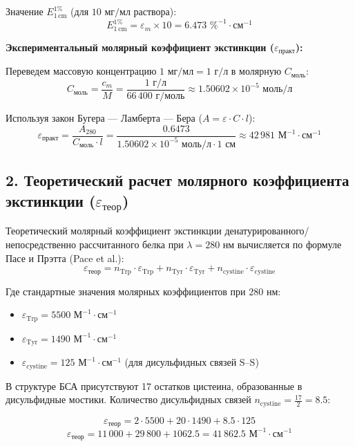 \documentclass[a4paper,12pt]{article}
\begin{document}
Значение $E^{1\%}_{1\,\text{cm}}$ (для $10\text{ мг/мл}$ раствора):
\[
E^{1\%}_{1\,\text{cm}} = \varepsilon_{m} \times 10 = 6.473\text{ \%}^{-1}\cdot\text{см}^{-1}
\]

\newpage
\textbf{Экспериментальный молярный коэффициент экстинкции ($\varepsilon_{\text{практ}}$):}

Переведем массовую концентрацию $1\text{ мг/мл} = 1\text{ г/л}$ в молярную $C_{\text{моль}}$:
\[
C_{\text{моль}} = \frac{c_m}{M} = \frac{1\text{ г/л}}{66\,400\text{ г/моль}} \approx 1.50602 \times 10^{-5}\text{ моль/л}
\]

Используя закон Бугера — Ламберта — Бера ($A = \varepsilon \cdot C \cdot l$):
\[
\varepsilon_{\text{практ}} = \frac{A_{280}}{C_{\text{моль}} \cdot l} = \frac{0.6473}{1.50602 \times 10^{-5}\text{ моль/л} \cdot 1\text{ см}} \approx 42\,981\text{ М}^{-1}\cdot\text{см}^{-1}
\]

\subsection*{2. Теоретический расчет молярного коэффициента экстинкции ($\varepsilon_{\text{теор}}$)}

Теоретический молярный коэффициент экстинкции денатурированного/непосредственно рассчитанного белка при $\lambda = 280\text{ нм}$ вычисляется по формуле Пасе и Прэтта (Pace et al.):
\[
\varepsilon_{\text{теор}} = n_{\text{Trp}} \cdot \varepsilon_{\text{Trp}} + n_{\text{Tyr}} \cdot \varepsilon_{\text{Tyr}} + n_{\text{cystine}} \cdot \varepsilon_{\text{cystine}}
\]

Где стандартные значения молярных коэффициентов при $280\text{ нм}$:
\begin{itemize}
    \item $\varepsilon_{\text{Trp}} = 5500\text{ М}^{-1}\cdot\text{см}^{-1}$
    \item $\varepsilon_{\text{Tyr}} = 1490\text{ М}^{-1}\cdot\text{см}^{-1}$
    \item $\varepsilon_{\text{cystine}} = 125\text{ М}^{-1}\cdot\text{см}^{-1}$ (для дисульфидных связей $\text{S–S}$)
\end{itemize}

В структуре БСА присутствуют 17 остатков цистеина, образованные в дисульфидные мостики. Количество дисульфидных связей $n_{\text{cystine}} = \frac{17}{2} = 8.5$:

\[
\varepsilon_{\text{теор}} = 2 \cdot 5500 + 20 \cdot 1490 + 8.5 \cdot 125
\]
\[
\varepsilon_{\text{теор}} = 11\,000 + 29\,800 + 1062.5 = 41\,862.5\text{ М}^{-1}\cdot\text{см}^{-1}
\]
\end{document}
